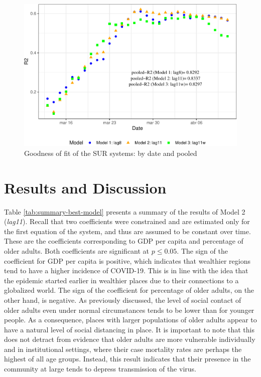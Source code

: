 \documentclass[]{elsarticle} %
\makeatletter
\def\maxwidth{\ifdim\Gin@nat@width>\linewidth\linewidth
\else\Gin@nat@width\fi}
\let\Oldincludegraphics\includegraphics
\renewcommand{\includegraphics}[1]{\Oldincludegraphics[width=\maxwidth]{#1}}
\makeatother
\begin{document}
\begin{figure}
\centering
\includegraphics{Environmental-Correlates-of-COVID19-Spain_files/figure-latex/goodness-of-fit-1.pdf}
\caption{\label{fig:goodness-of-fit} Goodness of fit of the SUR systems:
by date and pooled}
\end{figure}

\hypertarget{results-and-discussion}{%
\section{Results and Discussion}\label{results-and-discussion}}

Table \ref{tab:summary-best-model} presents a summary of the results of
Model 2 (\emph{lag11}). Recall that two coefficients were constrained
and are estimated only for the first equation of the system, and thus
are assumed to be constant over time. These are the coefficients
corresponding to GDP per capita and percentage of older adults. Both
coefficients are significant at \(p\leq0.05\). The sign of the
coefficient for GDP per capita is positive, which indicates that
wealthier regions tend to have a higher incidence of COVID-19. This is
in line with the idea that the epidemic started earlier in wealthier
places due to their connections to a globalized world. The sign of the
coefficient for percentage of older adults, on the other hand, is
negative. As previously discussed, the level of social contact of older
adults even under normal circumstances tends to be lower than for
younger people. As a consequence, places with larger populations of
older adults appear to have a natural level of social distancing in
place. It is important to note that this does not detract from evidence
that older adults are more vulnerable individually and in institutional
settings, where their case mortality rates are perhaps the highest of
all age groups. Instead, this result indicates that their presence in
the community at large tends to depress transmission of the virus.
\end{document}
